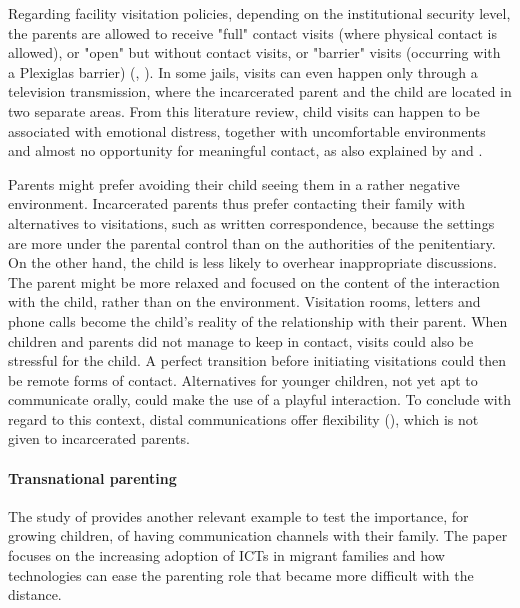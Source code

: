 Regarding facility visitation policies, depending on the institutional security level, the parents are allowed to receive "full" contact visits (where physical contact is allowed), or "open" but without contact visits, or "barrier" visits (occurring with a Plexiglas barrier) (\cite{johnston1995parent}, \cite{sturges2005survey}). In some jails, visits can even happen only through a television transmission, where the incarcerated parent and the child are located in two separate areas. From this literature review, child visits can happen to be associated with emotional distress, together with uncomfortable environments and almost no opportunity for meaningful contact, as also explained by \textcite{arditti2003locked} and \textcite{loper2009parenting}.

Parents might prefer avoiding their child seeing them in a rather negative environment. Incarcerated parents thus prefer contacting their family with alternatives to visitations, such as written correspondence, because the settings are more under the parental control than on the authorities of the penitentiary. On the other hand, the child is less likely to overhear inappropriate discussions. The parent might be more relaxed and focused on the content of the interaction with the child, rather than on the environment. Visitation rooms, letters and phone calls become the child’s reality of the relationship with their parent. When children and parents did not manage to keep in contact, visits could also be stressful for the child. A perfect transition before initiating visitations could then be remote forms of contact. Alternatives for younger children, not yet apt to communicate orally, could make the use of a playful interaction. To conclude with regard to this context, distal communications offer flexibility (\cite{tuerk2006contact}), which is not given to incarcerated parents.

\vspace{4pt}
\paragraph{Transnational parenting}
The study of \textcite{bacigalupe2011virtualizing} provides another relevant example to test the importance, for growing children, of having communication channels with their family. The paper focuses on the increasing adoption of ICTs in migrant families and how technologies can ease the parenting role that became more difficult with the distance. 


